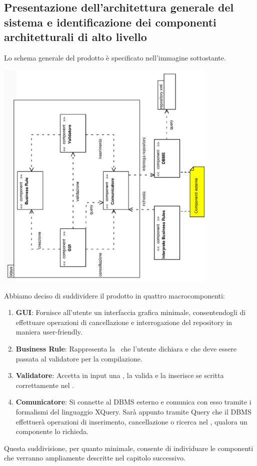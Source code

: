 \documentclass[11pt,titlepage,a4paper]{report}
\begin{document}
\subsection{Presentazione dell'architettura generale del sistema e identificazione dei componenti architetturali di alto livello}
Lo schema generale del prodotto \`e specificato nell'immagine sottostante.
\begin{center}
\includegraphics[width=0.8\textwidth, angle=-90]{DiagrammaClassi/schemagenerale.eps}
\end{center}
Abbiamo deciso di suddividere il prodotto in quattro macrocomponenti:
\begin{enumerate}
 \item \textbf{GUI}: Fornisce all'utente un interfaccia grafica minimale, consentendogli di effettuare operazioni di cancellazione e interrogazione del repository in maniera user-friendly.
\item \textbf{Business Rule}: Rappresenta la \br\ che l'utente dichiara e che deve essere passata al validatore per la compilazione.
\item \textbf{Validatore}: Accetta in input una \br, la valida e la inserisce se scritta correttamente nel \re.
\item \textbf{Comunicatore}: Si connette al DBMS esterno e comunica con esso tramite i formalismi del linguaggio XQuery.
Sar\`a appunto tramite Query che il DBMS effettuer\`a operazioni di inserimento, cancellazione o ricerca nel \re, qualora un componente lo richieda.
\end{enumerate}
Questa suddivisione, per quanto minimale, consente di individuare le componenti che verranno ampliamente descritte nel capitolo successivo.
\end{document}
